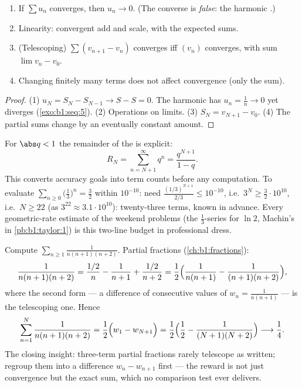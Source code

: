 \begin{proposition}\label{prop:b1:series:first}
\begin{enumerate}
  \item If $\sum u_n$ converges, then $u_n \to 0$. (The converse is
        \emph{false}: the harmonic .)
  \item Linearity: convergent  add and scale, with the expected
        sums.
  \item (Telescoping) $\sum (v_{n+1} -
        v_n)$ converges iff $(v_n)$ converges, with sum $\lim v_n -
        v_0$.
  \item Changing finitely many terms does not affect convergence
        (only the sum).
\end{enumerate}
\end{proposition}

\begin{proof}
(1) $u_N = S_N - S_{N-1} \to S - S = 0$. The harmonic  has
$u_n = \frac1n \to 0$ yet diverges (\cref{exo:b1:seq:5}). (2)
Operations on limits. (3) $S_N = v_{N+1} - v_0$. (4) The partial
sums change by an eventually constant amount.
\end{proof}

\begin{example}\label{ex:b1:series:georemainder}
For $\abs q < 1$ the remainder of the  is
explicit:
\[
R_N = \sum_{n = N+1}^{\infty} q^n = \frac{q^{N+1}}{1 - q} .
\]
This converts accuracy goals into term counts before any
computation. To evaluate $\sum_{n\geq0} \bigl(\frac13\bigr)^n =
\frac32$ within $10^{-10}$: need $\frac{(1/3)^{N+1}}{2/3} \leq
10^{-10}$, i.e.\ $3^{N} \geq \frac{3}{2}\cdot 10^{10}$, i.e.\ $N
\geq 22$ (as $3^{22} \approx 3.1\cdot10^{10}$): twenty-three
terms, known in advance. Every geometric-rate estimate of the
weekend problems (the $\frac13$-series for $\ln 2$, Machin's
 in \cref{pb:b1:taylor:1}) is this two-line budget
in professional dress.
\end{example}

\begin{example}\label{ex:b1:series:telescope3}
Compute $\sum_{n\geq1} \frac{1}{n(n+1)(n+2)}$. Partial
fractions (\cref{ch:b1:fractions}):
\[
\frac{1}{n(n+1)(n+2)}
= \frac{1/2}{n} - \frac{1}{n+1} + \frac{1/2}{n+2}
= \frac12\Bigl(\frac{1}{n(n+1)} - \frac{1}{(n+1)(n+2)}\Bigr),
\]
where the second form --- a difference of consecutive values of
$w_n = \frac{1}{n(n+1)}$ --- is the telescoping one. Hence
\[
\sum_{n=1}^{N} \frac{1}{n(n+1)(n+2)}
= \frac12\Bigl(w_1 - w_{N+1}\Bigr)
= \frac12\Bigl(\frac12 - \frac{1}{(N+1)(N+2)}\Bigr)
\longrightarrow \frac14 .
\]
The closing insight: three-term partial fractions rarely
telescope as written; regroup them into a difference $w_n -
w_{n+1}$ first --- the reward is not just convergence but the
exact sum, which no comparison test ever delivers.
\end{example}

